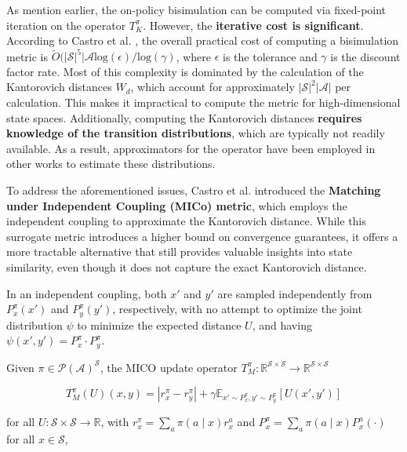 As mention earlier, the on-policy bisimulation can be computed via fixed-point iteration on the operator $T_K^\pi$. However, the \textbf{iterative cost is significant}. According to Castro et al. \cite{castro2021mico}, the overall practical cost of computing a bisimulation metric is $\tilde{O}(|\mathcal{S}|^5 |\mathcal{A} \text{log}(\epsilon)/\text{log}(\gamma)$, where $\epsilon$ is the tolerance and $\gamma$ is the discount factor rate. Most of this complexity is dominated by the calculation of the Kantorovich distances $W_d$, which account for approximately $|\mathcal{S}|^2 |\mathcal{A}|$ per calculation. This makes it impractical to compute the metric for high-dimensional state spaces. Additionally, computing the Kantorovich distances \textbf{requires knowledge of the transition distributions}, which are typically not readily available. As a result, approximators for the operator have been employed in other works \cite{castro2020scalable, zhang2020learning} to estimate these distributions.

To address the aforementioned issues, Castro et al. \cite{castro2021mico} introduced the \textbf{Matching under Independent Coupling (MICo) metric}, which employs the independent coupling to approximate the Kantorovich distance. While this surrogate metric introduces a higher bound on convergence guarantees, it offers a more tractable alternative that still provides valuable insights into state similarity, even though it does not capture the exact Kantorovich distance.

In an independent coupling, both $x'$ and $y'$ are sampled independently from $P_x^\pi(x')$ and $P_y^\pi(y')$, respectively, with no attempt to optimize the joint distribution $\psi$ to minimize the expected distance $U$, and having $\psi(x',y') = P_x^\pi \cdot P_y^\pi$.

\begin{definition} 
Given $\pi \in \mathcal{P(A)}^{\mathcal{S}}$, the MICO update operator $T^\pi_M : \mathbb{R}^{\mathcal{S} \times \mathcal{S}} \rightarrow \mathbb{R}^{\mathcal{S} \times \mathcal{S}}$

\begin{equation}
\label{eq:mico_operator}
    T^\pi_M(U)(x, y) = |r^\pi_{x} - r^\pi_{y}| + \gamma \mathbb{E}_{x'\sim P_x^\pi, y'\sim P_y^\pi}\left[U(x',y') \right]
\end{equation}

for all $U: \mathcal{S} \times \mathcal{S} \rightarrow \mathbb{R}$, with $r_x^\pi =\sum_a \pi(a \mid x) r_x^a$ and $P_x^\pi =\sum_a \pi(a \mid x) P^a_x(\cdot) $ for all $x \in \mathcal{S}$, 
\end{definition}

